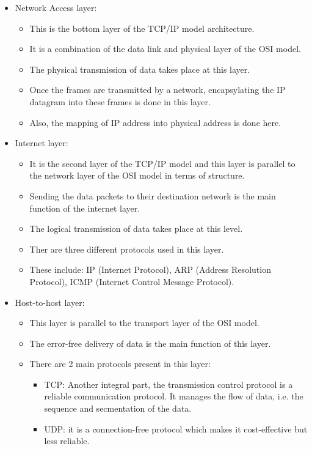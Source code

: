 \begin{itemize}
    \item Network Access layer:
        \begin{itemize}
            \item This is the bottom layer of the TCP/IP model architecture.
            \item It is a combination of the data link and physical layer of the OSI model.
            \item The physical transmission of data takes place at this layer.
            \item Once the frames are transmitted by a network, encapsylating the IP datagram into these frames is done in this layer.
            \item Also, the mapping of IP address into physical address is done here.
        \end{itemize}
    
    \item Internet layer:
        \begin{itemize}
            \item It is the second layer of the TCP/IP model and this layer is parallel to the network layer of the OSI model in terms of structure.
            \item Sending the data packets to their destination network is the main function of the internet layer.
            \item The logical transmission of data takes place at this level. 
            \item Ther are three different protocols used in this layer.
            \item These include: IP (Internet Protocol), ARP (Address Resolution Protocol), ICMP (Internet Control Message Protocol).
        \end{itemize}
    
    \item Host-to-host layer:
        \begin{itemize}
            \item This layer is parallel to the transport layer of the OSI model.
            \item The error-free delivery of data is the main function of this layer.
            \item There are 2 main protocols present in this layer:
                \begin{itemize}
                    \item TCP: Another integral part, the transmission control protocol is a reliable communication protocol. It manages the flow of data, i.e. the sequence and secmentation of the data.
                    \item UDP: it is a connection-free protocol which makes it cost-effective but less reliable.
                \end{itemize}
        \end{itemize}
    

\end{itemize}
